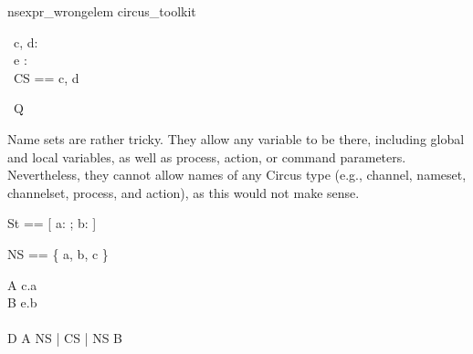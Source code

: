 \begin{zsection}
   \SECTION nsexpr\_wrongelem \parents circus\_toolkit
\end{zsection}

\begin{circus}
   \circchannel\ c, d: \nat \\
   \circchannel\ e : \nat \cross \nat \\
   \circchannelset\ CS == \lchanset c, d \rchanset
\end{circus}

\begin{circus}
   \circprocess\ Q \circdef \circbegin
\end{circus}

Name sets are rather tricky. They allow any variable to be there,
including global and local variables, as well as process, action,
or command parameters. Nevertheless, they cannot allow names of
any Circus type (e.g., channel, nameset, channelset, process, 
and action), as this would not make sense. 
\begin{circusaction}
    \circstate St == [ a: \nat; b: \nat \cross \nat ]
\end{circusaction}

\begin{circusaction}
   \circnameset NS == \{ a, b, c \}
\end{circusaction}

\begin{circusaction}
    A \circdef c.a \then \Skip
    \\
    B \circdef e.b \then \Skip
    \\
    \\
    D \circdef A \lpar NS | CS | NS \rpar B
    \\    
\end{circusaction}

\begin{circusaction}
    \circspot \Skip
\end{circusaction}

\begin{circus}
   \circend
\end{circus}


